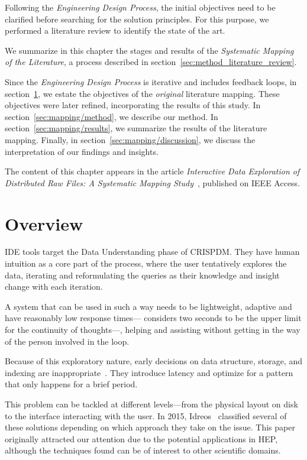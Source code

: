 \glsresetall

Following the \emph{Engineering Design Process}, the initial objectives
need to be clarified before searching for the solution principles.
For this purpose, we performed a literature review to identify the
state of the art.

We summarize in this chapter the stages and results of the
\emph{Systematic Mapping of the Literature}, a process described in section~\ref{sec:method_literature_review}.

Since the \emph{Engineering Design Process} is iterative and includes feedback loops, in
section~\ref{sec:mapping/overview}, we estate the objectives of the
\emph{original} literature mapping. These objectives were later refined,
incorporating the results of this study.
In section~\ref{sec:mapping/method}, we describe our method.
In section~\ref{sec:mapping/results}, we summarize the results of the literature mapping.
Finally, in section~\ref{sec:mapping/discussion}, we discuss the interpretation of our findings
and insights.

The content of this chapter appears in the article \emph{Interactive Data Exploration
of Distributed Raw Files: A Systematic Mapping Study}~\cite{Alvarez2019},
published on IEEE Access.

\section{Overview}
\label{sec:mapping/overview}
\gls{IDE} tools target the Data Understanding phase of \gls{CRISPDM}. They have
human intuition as a core part of the process, where the user tentatively
explores the data, iterating and reformulating the queries as
their knowledge and insight change with each iteration.

A system that can be used in such a way needs to be lightweight, adaptive
and have reasonably low response times---\cite{Miller1968} considers two seconds
to be the upper limit for the continuity of thoughts---,
helping and assisting without getting in the way of the person involved in
the loop.

Because of this exploratory nature, early decisions on data structure,
storage, and indexing are inappropriate~\cite{Kersten2011}. They introduce latency
and optimize for a pattern that only happens for a brief period.

This problem can be tackled at different levels---from the physical layout on disk
to the interface interacting with the user. In 2015, Idreos~\cite{Idreos2015}
classified several of these solutions depending on which approach they take
on the issue. This paper originally attracted our attention  due to the potential
applications in \gls{HEP}\footnotemark, although
the techniques found can be of interest to other scientific domains.

